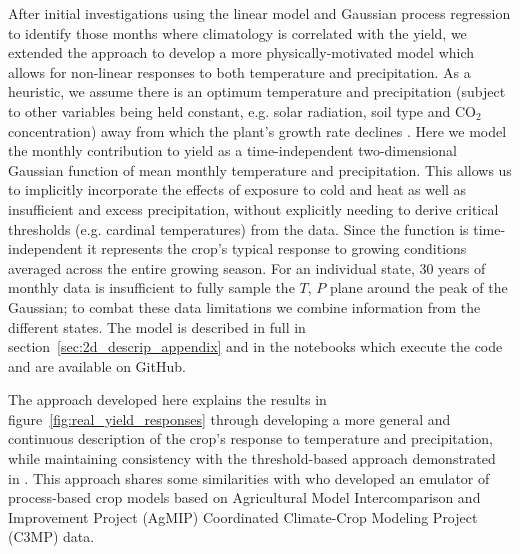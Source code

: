 \documentclass[12pt]{iopart}
\newcommand{\remove}[1]{}
\newcommand{\add}[1]{#1}
\begin{document}
After initial investigations using the linear model and Gaussian process regression to identify \remove{key months}\add{those months where climatology is correlated with the yield}, we extended the approach to develop a more physically-motivated model \add{which allows for non-linear responses to both temperature and precipitation}. As a heuristic, we assume there is an optimum temperature and precipitation (subject to other variables being held constant, e.g. solar radiation, soil type and CO$_{2}$ concentration) away from which the plant's growth rate declines \citep[c.f.][]{cutforth:1990, yin:1995, wang:1998, hatfield:2015, korres:2016, tigchelaar:2018}. \remove{For generality, we proceed by representing }\add{Here we model the monthly contribution to yield} \remove{this growth response function} as a time-independent two-dimensional Gaussian \add{function of mean monthly temperature and precipitation}. \add{This allows us to implicitly incorporate the effects of exposure to cold and heat as well as insufficient and excess precipitation, without explicitly needing to derive critical thresholds (e.g. cardinal temperatures) from the data.} Since the function is time-independent it represents the crop's typical response to growing conditions averaged across the entire growing season. For an individual state, 30 years of monthly data is insufficient to fully sample the $T$, $P$ plane around the peak of the Gaussian; to combat these data limitations we combine information from the different states. The model is described in full in section~\ref{sec:2d_descrip_appendix} and in the notebooks which execute the code and are available on GitHub.

The approach developed here\remove{ seeks to provide the context for}\add{ explains} the results in figure~\ref{fig:real_yield_responses} through developing a more general and continuous description of the crop's response to temperature and precipitation, while maintaining consistency with the threshold-based approach demonstrated in \cite{kent:2017}. \remove{More generally, the}\add{This} approach shares some similarities with \cite{snyder:2018} who developed an emulator of process-based crop models based on Agricultural Model Intercomparison and Improvement Project (AgMIP) Coordinated Climate-Crop Modeling Project (C3MP) data.
\end{document}
